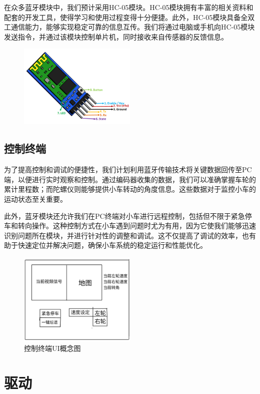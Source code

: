 \documentclass{report}
\begin{document}
在众多蓝牙模块中，我们预计采用HC-05模块。HC-05模块拥有丰富的相关资料和配套的开发工具，使得学习和使用过程变得十分便捷。此外，HC-05模块具备全双工通信能力，能够实现稳定可靠的信息互传。我们将通过电脑或手机向HC-05模块发送指令，并通过该模块控制单片机，同时接收来自传感器的反馈信息。
\begin{figure}[ht]
  \centering
  \includegraphics[width=0.5\textwidth]{figures/hc-05.png}
  \caption{\label{fig:label} }
\end{figure}
\newpage
\subsection{控制终端}
\label{subsec:label}
为了提高控制和调试的便捷性，我们计划利用蓝牙传输技术将关键数据回传至PC端，以便进行实时观察和控制。通过编码器收集的数据，我们可以准确掌握车轮的累计里程数；而陀螺仪则能够提供小车转动的角度信息。这些数据对于监控小车的运动状态至关重要。

此外，蓝牙模块还允许我们在PC终端对小车进行远程控制，包括但不限于紧急停车和转向操作。这种控制方式在小车遇到问题时尤为有用，因为它使我们能够迅速识别问题所在模块，并进行针对性的调整和调试。这不仅提高了调试的效率，也有助于快速定位并解决问题，确保小车系统的稳定运行和性能优化。
\begin{figure}[ht]
  \centering
  \includegraphics[width=0.5\textwidth]{figures/ui.jpg}
  \caption{控制终端UI概念图 }
\end{figure}


\section{驱动}
\label{sec:label}
\end{document}

